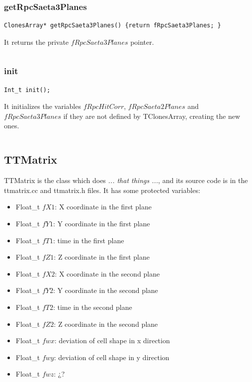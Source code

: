 \documentclass[a4paper]{book}
\begin{document}
\[\]

\subsubsection{getRpcSaeta3Planes}

\begin{lstlisting}
ClonesArray* getRpcSaeta3Planes() {return fRpcSaeta3Planes; }
\end{lstlisting}

It returns the private $fRpcSaeta3Planes$ pointer.

\[\]

\subsubsection{init}

\begin{lstlisting}
Int_t init();
\end{lstlisting}

It initializes the variables $fRpcHitCorr$, $fRpcSaeta2Planes$ and $fRpcSaeta3Planes$ if they are not defined by TClonesArray, creating the new ones.

\[\]

\subsection{TTMatrix}

TTMatrix is the class which does \textit{... that things ...}, and its source code is in the ttmatrix.cc and ttmatrix.h files. It has some protected variables:

\begin{itemize}
	\item Float\_t $fX1$: X coordinate in the first plane
	\item Float\_t $fY1$: Y coordinate in the first plane
	\item Float\_t $fT1$: time in the first plane
	\item Float\_t $fZ1$: Z coordinate in the first plane
	\item Float\_t $fX2$: X coordinate in the second plane
	\item Float\_t $fY2$: Y coordinate in the second plane
	\item Float\_t $fT2$: time in the second plane
	\item Float\_t $fZ2$: Z coordinate in the second plane
	\item Float\_t $fwx$: deviation of cell shape in x direction
	\item Float\_t $fwy$: deviation of cell shape in y direction
	\item Float\_t $fwz$: ¿?
\end{itemize}
\end{document}
